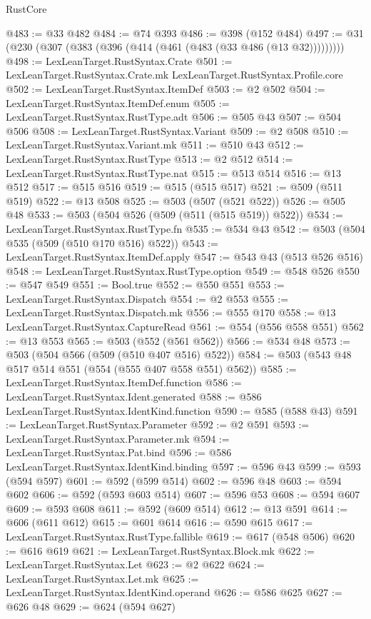 \begin{lexlean}{RustCore}
\begin{coremodule}
@483 := @33 @482
@484 := @74 @393
@486 := @398 (@152 @484)
@497 := @31 (@230 (@307 (@383 (@396 (@414 (@461 (@483 (@33 @486 (@13 @32)))))))))
@498 := LexLeanTarget.RustSyntax.Crate
@501 := LexLeanTarget.RustSyntax.Crate.mk LexLeanTarget.RustSyntax.Profile.core
@502 := LexLeanTarget.RustSyntax.ItemDef
@503 := @2 @502
@504 := LexLeanTarget.RustSyntax.ItemDef.enum
@505 := LexLeanTarget.RustSyntax.RustType.adt
@506 := @505 @43
@507 := @504 @506
@508 := LexLeanTarget.RustSyntax.Variant
@509 := @2 @508
@510 := LexLeanTarget.RustSyntax.Variant.mk
@511 := @510 @43
@512 := LexLeanTarget.RustSyntax.RustType
@513 := @2 @512
@514 := LexLeanTarget.RustSyntax.RustType.nat
@515 := @513 @514
@516 := @13 @512
@517 := @515 @516
@519 := @515 (@515 @517)
@521 := @509 (@511 @519)
@522 := @13 @508
@525 := @503 (@507 (@521 @522))
@526 := @505 @48
@533 := @503 (@504 @526 (@509 (@511 (@515 @519)) @522))
@534 := LexLeanTarget.RustSyntax.RustType.fn
@535 := @534 @43
@542 := @503 (@504 @535 (@509 (@510 @170 @516) @522))
@543 := LexLeanTarget.RustSyntax.ItemDef.apply
@547 := @543 @43 (@513 @526 @516)
@548 := LexLeanTarget.RustSyntax.RustType.option
@549 := @548 @526
@550 := @547 @549
@551 := Bool.true
@552 := @550 @551
@553 := LexLeanTarget.RustSyntax.Dispatch
@554 := @2 @553
@555 := LexLeanTarget.RustSyntax.Dispatch.mk
@556 := @555 @170
@558 := @13 LexLeanTarget.RustSyntax.CaptureRead
@561 := @554 (@556 @558 @551)
@562 := @13 @553
@565 := @503 (@552 (@561 @562))
@566 := @534 @48
@573 := @503 (@504 @566 (@509 (@510 @407 @516) @522))
@584 := @503 (@543 @48 @517 @514 @551 (@554 (@555 @407 @558 @551) @562))
@585 := LexLeanTarget.RustSyntax.ItemDef.function
@586 := LexLeanTarget.RustSyntax.Ident.generated
@588 := @586 LexLeanTarget.RustSyntax.IdentKind.function
@590 := @585 (@588 @43)
@591 := LexLeanTarget.RustSyntax.Parameter
@592 := @2 @591
@593 := LexLeanTarget.RustSyntax.Parameter.mk
@594 := LexLeanTarget.RustSyntax.Pat.bind
@596 := @586 LexLeanTarget.RustSyntax.IdentKind.binding
@597 := @596 @43
@599 := @593 (@594 @597)
@601 := @592 (@599 @514)
@602 := @596 @48
@603 := @594 @602
@606 := @592 (@593 @603 @514)
@607 := @596 @53
@608 := @594 @607
@609 := @593 @608
@611 := @592 (@609 @514)
@612 := @13 @591
@614 := @606 (@611 @612)
@615 := @601 @614
@616 := @590 @615
@617 := LexLeanTarget.RustSyntax.RustType.fallible
@619 := @617 (@548 @506)
@620 := @616 @619
@621 := LexLeanTarget.RustSyntax.Block.mk
@622 := LexLeanTarget.RustSyntax.Let
@623 := @2 @622
@624 := LexLeanTarget.RustSyntax.Let.mk
@625 := LexLeanTarget.RustSyntax.IdentKind.operand
@626 := @586 @625
@627 := @626 @48
@629 := @624 (@594 @627)

\end{coremodule}
\end{lexlean}
